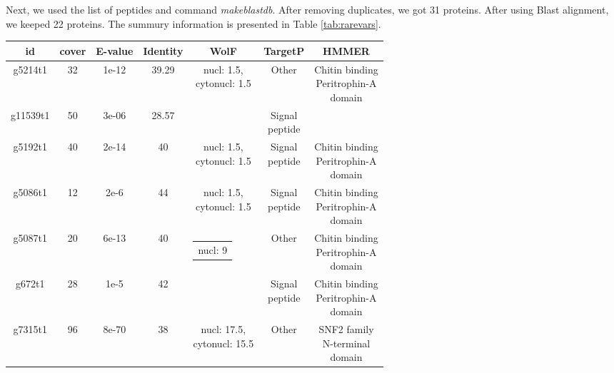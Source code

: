 \documentclass{article}
\makeatletter
\newcommand{\specialcell}[2][c]{%
	\begin{tabular}[#1]{@{}c@{}}#2\end{tabular}}
\makeatother
\begin{document}
 Next, we used the list of peptides and command \emph{makeblastdb}. After removing duplicates, we got 31 proteins. After using Blast alignment, we keeped 22 proteins. The summury information is presented in Table \ref*{tab:rarevars}.
 \begin{longtable}{|c|c|c|c|c|c|c|}
  	\hline
 		id & cover &  	E-value	&  Identity & WolF & TargetP &	HMMER \\
 		 		\hline
 		g5214t1 & 32  &	1e-12 & 39.29 & \specialcell{nucl: 1.5, \\ cytonucl: 1.5}  & Other & \specialcell{ Chitin binding \\Peritrophin-A \\ domain}  \\ 
	\hline
  		g11539t1 & 50  &	3e-06 & 28.57 & \specialcell{ }  & \specialcell{Signal \\ peptide} & \specialcell{  }  \\ 
 \hline
  		g5192t1 & 40  &		2e-14 & 40 & \specialcell{nucl: 1.5, \\ cytonucl: 1.5}  & \specialcell{Signal \\ peptide} & \specialcell{Chitin binding \\
  			Peritrophin-A
  			\\ domain}  \\ 
 \hline
  		g5086t1 & 12  &	2e-6 & 44& \specialcell{nucl: 1.5, \\ cytonucl: 1.5}  &   \specialcell{Signal \\ peptide}  & \specialcell{ Chitin binding \\Peritrophin-A \\ domain}  \\ 
 \hline
  		g5087t1 & 20  &	6e-13 & 40 & \specialcell{nucl: 9}  & Other & \specialcell{ Chitin binding \\Peritrophin-A \\ domain}  \\ 
 \hline
  		g672t1 & 28  &	1e-5 & 42 & \specialcell{ }  &  \specialcell{Signal \\ peptide}  & \specialcell{ Chitin binding \\Peritrophin-A \\ domain}  \\ 
 \hline
  		g7315t1 & 96  &	8e-70 & 38  & \specialcell{nucl: 17.5, \\ cytonucl: 15.5 }  & Other & \specialcell{ SNF2 family \\
  			N-terminal \\  
  			domain}  \\ 
 \hline
 

\end{longtable}
\end{document}
